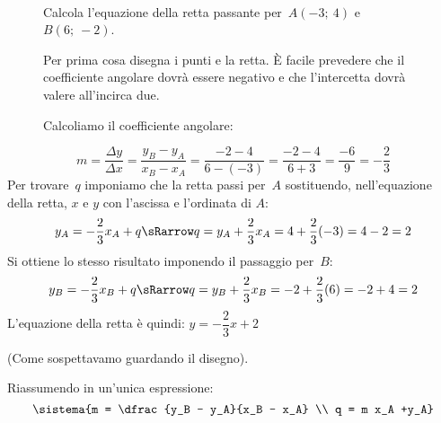  \begin{esempio}
~

\begin{inaccessibleblock}
 \begin{figure}[h]
\centering \hspace{-5mm}
 \begin{minipage}[]{.40\textwidth}
Calcola l'equazione della retta passante per~\(A(-3;~4)\) e~\(B(6;~-2)\).

\vspace{1em}
Per prima cosa disegna i punti e la retta. È facile prevedere che il 
coefficiente angolare dovrà essere negativo e che l'intercetta dovrà valere
all'incirca due.

\vspace{1em}
Calcoliamo il coefficiente angolare:
 \end{minipage}
 \begin{minipage}[]{.60\textwidth}
   \centering \rettac
 \end{minipage}
\label{fig:rettac}
\end{figure}
\end{inaccessibleblock}
\[m = \frac{\Delta y}{\Delta x} = \frac{y_B - y_A}{x_B - x_A} =
      \frac{-2 - 4}{6 -(-3)} = \frac{-2 - 4}{6 + 3} = \frac{-6}{9} = 
      - \frac{2}{3}
\]
Per trovare~\(q\) imponiamo che la retta passi per~\(A\) sostituendo, 
nell'equazione della retta, \(x\) e \(y\) con l'ascissa e l'ordinata di \(A\): 
\[y_A = - \dfrac{2}{3} x_A + q \sRarrow 
    q = y_A +\dfrac{2}{3} x_A = 4 +\dfrac{2}{3} (-3) = 4 - 2 = 2\]
Si ottiene lo stesso risultato imponendo il passaggio per~\(B\): 
\[y_B = - \dfrac{2}{3} x_B + q \sRarrow 
    q = y_B +\dfrac{2}{3} x_B = -2 +\dfrac{2}{3} (6) = -2 +4 = 2\]
\noindent L'equazione della retta è quindi: \quad
\(y = - \dfrac{2}{3} x + 2\) 

(Come sospettavamo guardando il disegno).
 \end{esempio}
 Riassumendo in un'unica espressione:
 \[\sistema{m = \dfrac{y_B - y_A}{x_B - x_A} \\ q = m x_A +y_A}\]

% 


